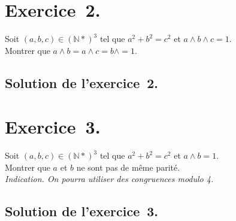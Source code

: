 \documentclass[a4paper,14pt]{extarticle} %
\def\eclaire{\mathbb}
\def\N{\ensuremath{\eclaire N}}
\begin{document}
\section*{Exercice~2.}

Soit $(a,b,c) \in (\N*)^3$ tel que $a^2+b^2=c^2$ et $ a \wedge b \wedge c =1$.\\ Montrer que $a \wedge b = a \wedge c = b \wedge =1$.

\subsection*{Solution de l'exercice~2.}



\section*{Exercice~3.}

Soit $(a,b,c) \in (\N*)^3$ tel que $a^2+b^2=c^2$ et $ a \wedge b =1$.\\ Montrer que $a$ et $ b$ ne sont pas de même parité.\\
\textsl{Indication. On pourra utiliser des congruences modulo 4.}


\subsection*{Solution de l'exercice~3.}
\end{document}
